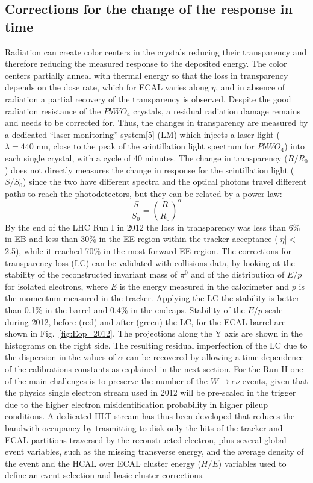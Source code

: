 \documentclass[journal]{IEEEtran}
\begin{document}
\subsection{Corrections for the change of the response in time}
Radiation can create color centers in the crystals reducing their transparency and therefore reducing the measured response to the deposited energy. The color centers partially anneal with thermal energy so that the loss in transparency depends on the dose rate, which for ECAL varies along $\eta$, and in absence of radiation a partial recovery of the transparency is observed.
Despite the good radiation resistance of the $PbWO_4$ crystals, a residual radiation damage remains and needs to be corrected for. Thus, the changes in transparency are measured by a dedicated ``laser monitoring'' system[5] (LM) which injects a laser light ($\lambda=440$ nm, close to the peak of the scintillation light spectrum for $PbWO_4$) into each single crystal, with a cycle of 40 minutes. The change in transparency ($R/R_0$) does not directly measures the change in response for the scintillation light ($S/S_0$) since the two have different spectra and the optical photons travel different paths to reach the photodetectors, but they can be related by a power law:
\begin{equation}
\frac{S}{S_0} = \left(\frac{R}{R_0}\right)^\alpha
\end{equation}
By the end of the LHC Run I in 2012 the loss in transparency was less than 6\% in EB and less than 30\% in the EE region within the tracker acceptance ($\vert\eta\vert<$2.5), while it reached 70\% in the most forward EE region. The corrections for transparency loss (LC) can be validated with collisions data, by looking at the stability of the reconstructed invariant mass of $\pi^0$ and of the distribution of $E/p$ for isolated electrons, where $E$ is the energy measured in the calorimeter and $p$ is the momentum measured in the tracker. Applying the LC the stability is better than 0.1\% in the barrel and 0.4\% in the endcaps.  Stability of the $E/p$ scale during 2012, before (red) and after (green) the LC, for the ECAL barrel are shown in Fig.~\ref{fig:Eop_2012}. The projections along the Y axis are shown in the histograms on the right side.
 The resulting residual imperfection of the LC due to the dispersion in the values of $\alpha$ can be recovered by allowing a time dependence of the calibrations constants as explained in the next section. For the Run II one of the main challenges is to preserve the number of the $W\to e\nu$ events, given that the physics single electron stream used in 2012 will be pre-scaled in the trigger due to the higher electron misidentification probability in higher pileup conditions. A dedicated HLT stream has thus been developed that reduces the bandwith occupancy by trasmitting to disk only the hits of the tracker and ECAL partitions traversed by the reconstructed electron, plus several global event variables, such as the missing transverse energy, and the average density of the event and the HCAL over ECAL cluster energy ($H/E$) variables used to define an event selection and basic cluster corrections.
\end{document}
